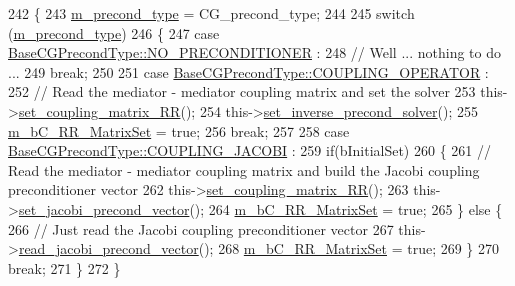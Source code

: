 \begin{DoxyCode}
242 \{
243     \hyperlink{classcarl_1_1_f_e_t_i___operations_a76e474f6c1b8bb99cee6a6645f15b25b}{m\_precond\_type} = CG\_precond\_type;
244 
245     \textcolor{keywordflow}{switch} (\hyperlink{classcarl_1_1_f_e_t_i___operations_a76e474f6c1b8bb99cee6a6645f15b25b}{m\_precond\_type})
246     \{
247         \textcolor{keywordflow}{case} \hyperlink{namespacecarl_ad52f21755b51ffa926038b59ae194ea8ad142a27fc7dfef6e36c5d01689880cc4}{BaseCGPrecondType::NO\_PRECONDITIONER} : 
248                 \textcolor{comment}{// Well ... nothing to do ...}
249                 \textcolor{keywordflow}{break};
250 
251         \textcolor{keywordflow}{case} \hyperlink{namespacecarl_ad52f21755b51ffa926038b59ae194ea8a0bdc3f2b24ccb8a7783e5cc3845f66f4}{BaseCGPrecondType::COUPLING\_OPERATOR} : 
252                 \textcolor{comment}{// Read the mediator - mediator coupling matrix and set the solver}
253                 this->\hyperlink{classcarl_1_1_f_e_t_i___operations_a72b5f4f66222ffefa79239ef70922f0c}{set\_coupling\_matrix\_RR}();
254                 this->\hyperlink{classcarl_1_1_f_e_t_i___operations_ad8f552c64ab905c4c8850f4678fec4e2}{set\_inverse\_precond\_solver}();
255                 \hyperlink{classcarl_1_1_f_e_t_i___operations_a1f272a523aba46755b2883394947bde0}{m\_bC\_RR\_MatrixSet} = \textcolor{keyword}{true};
256                 \textcolor{keywordflow}{break};
257 
258         \textcolor{keywordflow}{case} \hyperlink{namespacecarl_ad52f21755b51ffa926038b59ae194ea8a9e4642aac714757473ea34db75279a99}{BaseCGPrecondType::COUPLING\_JACOBI} :
259                 \textcolor{keywordflow}{if}(bInitialSet)
260                 \{
261                     \textcolor{comment}{// Read the mediator - mediator coupling matrix and build the Jacobi coupling
       preconditioner vector}
262                     this->\hyperlink{classcarl_1_1_f_e_t_i___operations_a72b5f4f66222ffefa79239ef70922f0c}{set\_coupling\_matrix\_RR}();
263                     this->\hyperlink{classcarl_1_1_f_e_t_i___operations_a6f88d5f12a587e1608797f7d15ef5f64}{set\_jacobi\_precond\_vector}();
264                     \hyperlink{classcarl_1_1_f_e_t_i___operations_a1f272a523aba46755b2883394947bde0}{m\_bC\_RR\_MatrixSet} = \textcolor{keyword}{true};
265                 \} \textcolor{keywordflow}{else} \{
266                     \textcolor{comment}{// Just read the Jacobi coupling preconditioner vector}
267                     this->\hyperlink{classcarl_1_1_f_e_t_i___operations_ac5592b98960866a9fbc214919030bf01}{read\_jacobi\_precond\_vector}();
268                     \hyperlink{classcarl_1_1_f_e_t_i___operations_a1f272a523aba46755b2883394947bde0}{m\_bC\_RR\_MatrixSet} = \textcolor{keyword}{true};
269                 \}
270                 \textcolor{keywordflow}{break};
271     \}
272 \}
\end{DoxyCode}
\hypertarget{classcarl_1_1_f_e_t_i___operations_a548253e562c086929dd880e1f5598630}{}
